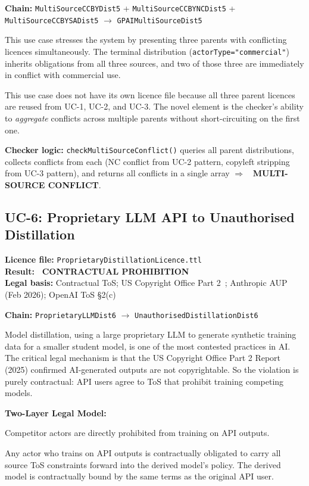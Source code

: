 \documentclass[12pt,a4paper]{article}
\newcommand{\violated}[1]{\textcolor{violation}{\textbf{\texttimes\ #1}}}
\begin{document}
\textbf{Chain:} \texttt{MultiSourceCCBYDist5} + \texttt{MultiSourceCCBYNCDist5} +\\
\quad\texttt{MultiSourceCCBYSADist5} $\rightarrow$ \texttt{GPAIMultiSourceDist5}

This use case stresses the system by presenting three parents with conflicting licences simultaneously. The terminal distribution (\texttt{actorType="commercial"}) inherits obligations from all three sources, and two of those three are immediately in conflict with commercial use.

This use case does not have its own licence file because all three parent licences are reused from UC-1, UC-2, and UC-3. The novel element is the checker's ability to \emph{aggregate} conflicts across multiple parents without short-circuiting on the first one.

\textbf{Checker logic:} \texttt{checkMultiSourceConflict()} queries all parent distributions, collects conflicts from each (NC conflict from UC-2 pattern, copyleft stripping from UC-3 pattern), and returns all conflicts in a single array $\Rightarrow$ \violated{MULTI-SOURCE CONFLICT}.

\subsection{UC-6: Proprietary LLM API to Unauthorised Distillation}
\textbf{Licence file:} \texttt{ProprietaryDistillationLicence.ttl}\\[2pt]
\textbf{Result:} \violated{CONTRACTUAL PROHIBITION}\\[4pt]
\textbf{Legal basis:} Contractual ToS; US Copyright Office Part 2~\cite{uscopyright2025}; Anthropic AUP (Feb 2026); OpenAI ToS \S 2(c)

\textbf{Chain:} \texttt{ProprietaryLLMDist6} $\rightarrow$ \texttt{UnauthorisedDistillationDist6}

Model distillation, using a large proprietary LLM to generate synthetic training data for a smaller student model, is one of the most contested practices in AI. The critical legal mechanism is that the US Copyright Office Part 2 Report (2025) confirmed AI-generated outputs are not copyrightable. So the violation is purely contractual: API users agree to ToS that prohibit training competing models.

\textbf{Two-Layer Legal Model:}

\begin{description}[leftmargin=2.5cm, style=nextline]
  \item[Layer 1 (Prohibition):] Competitor actors are directly prohibited from training on API outputs.
  \item[Layer 2 (Constraint Inheritance):] Any actor who trains on API outputs is contractually obligated to carry all source ToS constraints forward into the derived model's policy. The derived model is contractually bound by the same terms as the original API user.
\end{description}
\end{document}
